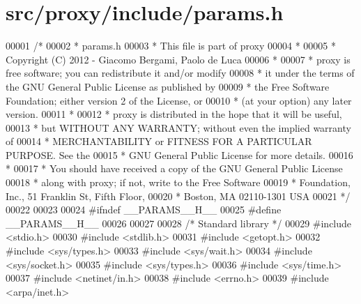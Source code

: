 \hypertarget{params_8h_source}{
\section{src/proxy/include/params.h}
}

\begin{DoxyCode}
00001 \textcolor{comment}{/*}
00002 \textcolor{comment}{ * params.h}
00003 \textcolor{comment}{ * This file is part of proxy}
00004 \textcolor{comment}{ *}
00005 \textcolor{comment}{ * Copyright (C) 2012 - Giacomo Bergami, Paolo de Luca}
00006 \textcolor{comment}{ *}
00007 \textcolor{comment}{ * proxy is free software; you can redistribute it and/or modify}
00008 \textcolor{comment}{ * it under the terms of the GNU General Public License as published by}
00009 \textcolor{comment}{ * the Free Software Foundation; either version 2 of the License, or}
00010 \textcolor{comment}{ * (at your option) any later version.}
00011 \textcolor{comment}{ *}
00012 \textcolor{comment}{ * proxy is distributed in the hope that it will be useful,}
00013 \textcolor{comment}{ * but WITHOUT ANY WARRANTY; without even the implied warranty of}
00014 \textcolor{comment}{ * MERCHANTABILITY or FITNESS FOR A PARTICULAR PURPOSE.  See the}
00015 \textcolor{comment}{ * GNU General Public License for more details.}
00016 \textcolor{comment}{ *}
00017 \textcolor{comment}{ * You should have received a copy of the GNU General Public License}
00018 \textcolor{comment}{ * along with proxy; if not, write to the Free Software}
00019 \textcolor{comment}{ * Foundation, Inc., 51 Franklin St, Fifth Floor, }
00020 \textcolor{comment}{ * Boston, MA  02110-1301  USA}
00021 \textcolor{comment}{ */}
00022 
00023 
00024 \textcolor{preprocessor}{#ifndef \_\_PARAMS\_\_H\_\_}
00025 \textcolor{preprocessor}{}\textcolor{preprocessor}{#define \_\_PARAMS\_\_H\_\_}
00026 \textcolor{preprocessor}{}
00027 
00028         \textcolor{comment}{/*      Standard library        */}
00029 \textcolor{preprocessor}{#include <stdio.h>}
00030 \textcolor{preprocessor}{#include <stdlib.h>}
00031 \textcolor{preprocessor}{#include <getopt.h>}
00032 \textcolor{preprocessor}{#include <sys/types.h>}
00033 \textcolor{preprocessor}{#include <sys/wait.h>}
00034 \textcolor{preprocessor}{#include <sys/socket.h>} 
00035 \textcolor{preprocessor}{#include <sys/types.h>}  
00036 \textcolor{preprocessor}{#include <sys/time.h>}           
00037 \textcolor{preprocessor}{#include <netinet/in.h>}         
00038 \textcolor{preprocessor}{#include <errno.h>}              
00039 \textcolor{preprocessor}{#include <arpa/inet.h>}  

\end{DoxyCode}
